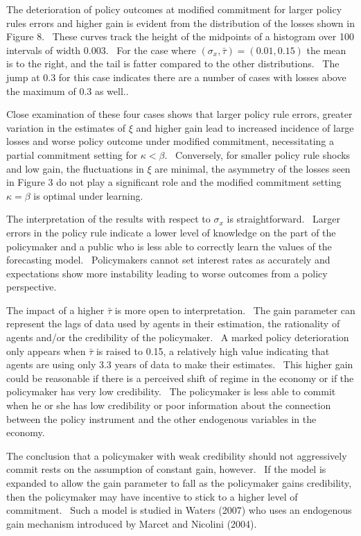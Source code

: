 \documentclass{article}
\begin{document}
\begin{doublespace}
The deterioration of policy outcomes at modified commitment for larger
policy rules errors and higher gain is evident from the distribution of the
losses shown in Figure 8. \ These curves track the height of the midpoints
of a histogram over 100 intervals of width 0.003. \ For the case where $%
\left( \sigma _{x},\bar{\tau}\right) =\left( 0.01,0.15\right) $ the mean is
to the right, and the tail is fatter compared to the other distributions. \
The jump at 0.3 for this case indicates there are a number of cases with
losses above the maximum of 0.3 as well..

Close examination of these four cases shows that larger policy rule errors,
greater variation in the estimates of $\xi $ and higher gain lead to
increased incidence of large losses and worse policy outcome under modified
commitment, necessitating a partial commitment setting for $\kappa <\beta $.
\ Conversely, for smaller policy rule shocks and low gain, the fluctuations
in $\xi $ are minimal, the asymmetry of the losses seen in Figure 3 do not
play a significant role and the modified commitment setting $\kappa =\beta $
is optimal under learning.

The interpretation of the results with respect to $\sigma _{x}$ is
straightforward. \ Larger errors in the policy rule indicate a lower level
of knowledge on the part of the policymaker and a public who is less able to
correctly learn the values of the forecasting model. \ Policymakers cannot
set interest rates as accurately and expectations show more instability
leading to worse outcomes from a policy perspective.

The impact of a higher $\bar{\tau}$ is more open to interpretation. \ The
gain parameter can represent the lags of data used by agents in their
estimation, the rationality of agents and/or the credibility of the
policymaker. \ A marked policy deterioration only appears when $\bar{\tau}$
is raised to 0.15, a relatively high value indicating that agents are using
only 3.3 years of data to make their estimates. \ This higher gain could be
reasonable if there is a perceived shift of regime in the economy or if the
policymaker has very low credibility. \ The policymaker is less able to
commit when he or she has low credibility or poor information about the
connection between the policy instrument and the other endogenous variables
in the economy.

The conclusion that a policymaker with weak credibility should not
aggressively commit rests on the assumption of constant gain, however. \ If
the model is expanded to allow the gain parameter to fall as the policymaker
gains credibility, then the policymaker may have incentive to stick to a
higher level of commitment. \ Such a model is studied in Waters (2007) who
uses an endogenous gain mechanism introduced by Marcet and Nicolini (2004).


\end{doublespace}
\end{document}
